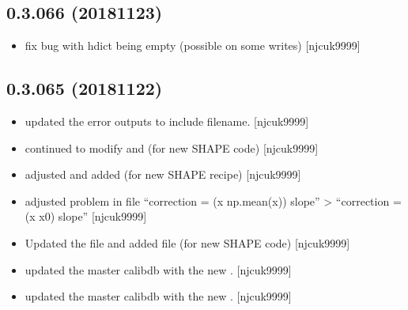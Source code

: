 \documentclass[a4paper,10pt,english]{report}
\begin{document}
\subsection{0.3.066 (2018\sphinxhyphen{}11\sphinxhyphen{}23)}
\label{\detokenize{misc/changelog:id275}}\begin{itemize}
\item {} 
 \sphinxhyphen{} fix bug with hdict being empty (possible on some
writes) {[}njcuk9999{]}

\end{itemize}


\subsection{0.3.065 (2018\sphinxhyphen{}11\sphinxhyphen{}22)}
\label{\detokenize{misc/changelog:id276}}\begin{itemize}
\item {} 
 \sphinxhyphen{} updated the error outputs to include filename.
{[}njcuk9999{]}

\item {} 
 \sphinxhyphen{} continued to modify  and 
(for new SHAPE code) {[}njcuk9999{]}

\item {} 
 \sphinxhyphen{} adjusted  and added
 (for new SHAPE recipe) {[}njcuk9999{]}

\item {} 
 \sphinxhyphen{} adjusted problem in  file “correction = (x
\sphinxhyphen{} np.mean(x)) \sphinxtitleref{*} slope” \textendash{}\textgreater{} “correction = (x \sphinxhyphen{} x0) \sphinxtitleref{*} slope” {[}njcuk9999{]}

\item {} 
Updated the  file and added  file
(for new SHAPE code) {[}njcuk9999{]}

\item {} 
 \sphinxhyphen{} updated the master calibdb with the new
. {[}njcuk9999{]}

\item {} 
 \sphinxhyphen{} updated the master calibdb with the new
. {[}njcuk9999{]}


\end{itemize}
\end{document}
